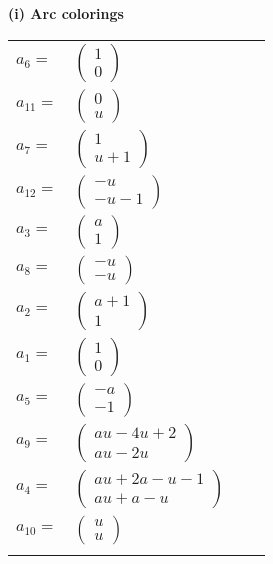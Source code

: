 \documentclass[1p]{elsarticle_modified}
\theoremstyle{definition}
\begin{document}
\flushleft \textbf{(i) Arc colorings}\\
\begin{tabular}{m{7pt} m{180pt} m{7pt} m{180pt} }
\flushright $a_{6}=$&$\begin{pmatrix}1\\0\end{pmatrix}$ \\
\flushright $a_{11}=$&$\begin{pmatrix}0\\u\end{pmatrix}$ \\
\flushright $a_{7}=$&$\begin{pmatrix}1\\u+1\end{pmatrix}$ \\
\flushright $a_{12}=$&$\begin{pmatrix}- u\\- u-1\end{pmatrix}$ \\
\flushright $a_{3}=$&$\begin{pmatrix}a\\1\end{pmatrix}$ \\
\flushright $a_{8}=$&$\begin{pmatrix}- u\\- u\end{pmatrix}$ \\
\flushright $a_{2}=$&$\begin{pmatrix}a+1\\1\end{pmatrix}$ \\
\flushright $a_{1}=$&$\begin{pmatrix}1\\0\end{pmatrix}$ \\
\flushright $a_{5}=$&$\begin{pmatrix}- a\\-1\end{pmatrix}$ \\
\flushright $a_{9}=$&$\begin{pmatrix}a u-4 u+2\\a u-2 u\end{pmatrix}$ \\
\flushright $a_{4}=$&$\begin{pmatrix}a u+2 a- u-1\\a u+a- u\end{pmatrix}$ \\
\flushright $a_{10}=$&$\begin{pmatrix}u\\u\end{pmatrix}$\\&\end{tabular}
\end{document}
